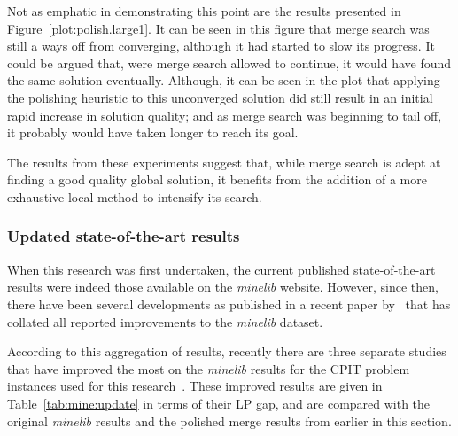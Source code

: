 \documentclass[journal]{IEEEtran}
\begin{document}
Not as emphatic in demonstrating this point are the results presented in Figure~\ref{plot:polish.large1}. It can be seen in this figure that merge search was still a ways off from converging, although it had started to slow its progress. It could be argued that, were merge search allowed to continue, it would have found the same solution eventually. Although, it can be seen in the plot that applying the polishing heuristic to this unconverged solution did still result in an initial rapid increase in solution quality; and as merge search was beginning to tail off, it probably would have taken longer to reach its goal.

The results from these experiments suggest that, while merge search is adept at finding a good quality global solution, it benefits from the addition of a more exhaustive local method to intensify its search. 

\subsubsection*{Updated state-of-the-art results}

When this research was first undertaken, the current published state-of-the-art results were indeed those available on the \emph{minelib} website. However, since then, there have been several developments as published in a recent paper by~\cite{minelib-improved} that has collated all reported improvements to the \emph{minelib} dataset.

According to this aggregation of results, recently there are three separate studies that have improved the most on the \emph{minelib} results for the CPIT problem instances used for this research~\cite{newman-improved,zuck-small-improved,aggregate}. These improved results are given in Table~\ref{tab:mine:update} in terms of their LP gap, and are compared with the original \emph{minelib} results and the polished merge results from earlier in this section.

% 
\end{document}
